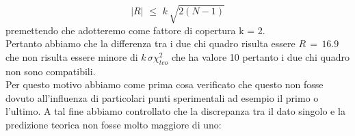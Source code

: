 \begin{equation*}
	|R| \,\, \leq \,\, k \, \sqrt{2(N - 1)}
\end{equation*}
%
premettendo che adotteremo come fattore di copertura k = 2.\\

Pertanto abbiamo che la differenza tra i due chi quadro risulta essere $R \,=\, 16.9$ che non risulta essere minore di $k \, \sigma \chi_{teo}^2$ che ha valore 10  pertanto i due chi quadro non sono compatibili.\\
Per questo motivo abbiamo come prima cosa verificato che questo non fosse dovuto all'influenza di particolari punti sperimentali ad esempio il primo o l'ultimo. A tal fine abbiamo controllato che la discrepanza tra il dato singolo e la predizione teorica non fosse molto maggiore di uno:

